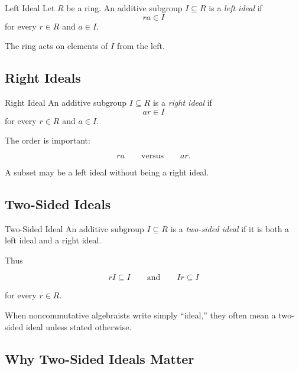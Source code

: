\begin{definitionbox}{Left Ideal}
Let \(R\) be a ring. An additive subgroup \(I\subseteq R\) is a
\emph{left ideal} if
\[ r a\in I \]
for every \(r\in R\) and \(a\in I\).
\end{definitionbox}

The ring acts on elements of \(I\) from the left.

\subsection{Right Ideals}
\label{subsec:right-ideals}

\begin{definitionbox}{Right Ideal}
An additive subgroup \(I\subseteq R\) is a \emph{right ideal} if
\[ a r\in I \]
for every \(r\in R\) and \(a\in I\).
\end{definitionbox}

The order is important:

\[ ra\qquad\text{versus}\qquad ar. \]

A subset may be a left ideal without being a right ideal.

\subsection{Two-Sided Ideals}
\label{subsec:two-sided-ideals}

\begin{definitionbox}{Two-Sided Ideal}
An additive subgroup \(I\subseteq R\) is a \emph{two-sided ideal} if it is
both a left ideal and a right ideal.
\end{definitionbox}

Thus

\[ rI\subseteq I\qquad\text{and}\qquad Ir\subseteq I \]

for every \(r\in R\).

When noncommutative algebraists write simply ``ideal,'' they often mean a
two-sided ideal unless stated otherwise.

\subsection{Why Two-Sided Ideals Matter}
\label{subsec:why-two-sided-ideals}

